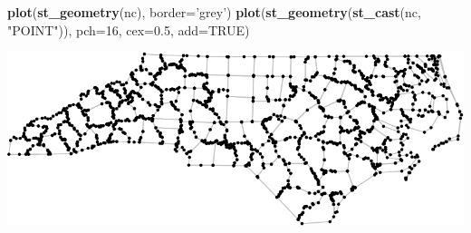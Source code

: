 \documentclass[11pt,ignorenonframetext,]{beamer}
\newenvironment{Shaded}{}{}
\newcommand{\DataTypeTok}[1]{\textcolor[rgb]{0.56,0.13,0.00}{#1}}
\newcommand{\DecValTok}[1]{\textcolor[rgb]{0.25,0.63,0.44}{#1}}
\newcommand{\FloatTok}[1]{\textcolor[rgb]{0.25,0.63,0.44}{#1}}
\newcommand{\KeywordTok}[1]{\textcolor[rgb]{0.00,0.44,0.13}{\textbf{#1}}}
\newcommand{\NormalTok}[1]{#1}
\newcommand{\OtherTok}[1]{\textcolor[rgb]{0.00,0.44,0.13}{#1}}
\newcommand{\StringTok}[1]{\textcolor[rgb]{0.25,0.44,0.63}{#1}}
\let\oldShaded\Shaded
\let\endoldShaded\endShaded
\renewenvironment{Shaded}{\footnotesize\begin{spacing}{0.9}\oldShaded}{\endoldShaded\end{spacing}}
\let\oldverbatim\verbatim
\let\endoldverbatim\endverbatim
\newcommand{\scriptoutput}{
  \renewenvironment{Shaded}{\scriptsize\begin{spacing}{0.9}\oldShaded}{\endoldShaded\end{spacing}}
  \renewenvironment{verbatim}{\scriptsize\begin{spacing}{0.9}\oldverbatim}{\endoldverbatim\end{spacing}}
}
\begin{document}
\begin{frame}[fragile,t]{}
\protect\hypertarget{section-1}{}

\scriptoutput

\begin{Shaded}
\begin{Highlighting}[]
\KeywordTok{plot}\NormalTok{(}\KeywordTok{st_geometry}\NormalTok{(nc), }\DataTypeTok{border=}\StringTok{'grey'}\NormalTok{)}
\KeywordTok{plot}\NormalTok{(}\KeywordTok{st_geometry}\NormalTok{(}\KeywordTok{st_cast}\NormalTok{(nc, }\StringTok{"POINT"}\NormalTok{)), }\DataTypeTok{pch=}\DecValTok{16}\NormalTok{, }\DataTypeTok{cex=}\FloatTok{0.5}\NormalTok{, }\DataTypeTok{add=}\OtherTok{TRUE}\NormalTok{)}
\end{Highlighting}
\end{Shaded}

\begin{center}\includegraphics[width=\textwidth]{Lec16_files/figure-beamer/unnamed-chunk-20-1} \end{center}

\end{frame}
\end{document}
